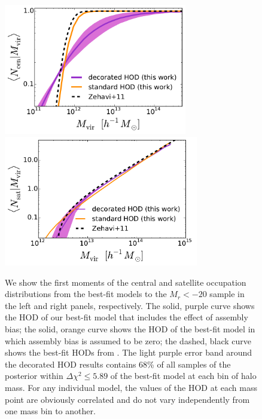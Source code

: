 \documentclass[usenatbib,usegraphicx,letterpaper]{mn2e}
\newcommand{\magr}{M_r}
\begin{document}
\begin{figure}
\begin{center}
\includegraphics[width=8.0cm]{central_hod_comparison.pdf}
\includegraphics[width=8.5cm]{satellite_hod_comparison.pdf}
\caption{
We show the first moments of the central and satellite occupation distributions
from the best-fit models to the $\magr<-20$ sample in the left and right
panels, respectively. The solid, purple curve shows the HOD of our best-fit model
that includes the effect of assembly bias; the solid, orange curve shows the HOD
of the best-fit model in which assembly bias is assumed to be zero;
the dashed, black curve shows the best-fit HODs from \citet{zehavi_etal11}.
The light purple error band around the decorated HOD results contains 68\% of 
all samples of the posterior within $\Delta \chi^2 \le 5.89$ of the best-fit model at 
each bin of halo mass. For any individual model, 
the values of the HOD at each mass point are obviously correlated and do 
not vary independently from one mass bin to another. 
}
\label{fig:directhodcomparison}
\end{center}
\end{figure}
\end{document}
